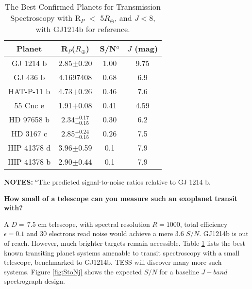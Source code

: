 \documentclass[12pt]{article}
\begin{document}
\begin{table}
 \centering
 \caption{The Best Confirmed Planets for Transmission Spectroscopy with R$_P$ $<$ 5$R_{\oplus}$, and $J<8$, with GJ1214b for reference.  }
 \label{tbl:StoN}
 \begin{tabular}{cccc}
    \hline
    \hline
    Planet & R$_P$($R_{\oplus}$) & S/N$^a$ &$J$ (mag) \\
    \hline
 GJ 1214 b  & 2.85$\pm$0.20 & 1.00 & 9.75\\
 GJ 436 b  & 4.1697408 & 0.68 & 6.9\\
 HAT-P-11 b  & 4.73$\pm$0.26 & 0.46 &7.6 \\
 55 Cnc e  & 1.91$\pm$0.08 & 0.41 & 4.59\\
 HD 97658 b  & 2.34$^{+0.17}_{-0.15}$ & 0.30 & 6.2\\
 HD 3167 c & 2.85$^{+0.24}_{-0.15}$ & 0.26 & 7.5\\
 HIP 41378 d  & 3.96$\pm$0.59 & 0.1 &7.9\\
 HIP 41378 b  & 2.90$\pm$0.44 & 0.1 &7.9\\
   \hline
    \hline
 \end{tabular}
\begin{flushleft}
 \footnotesize{ \textbf{\textsc{NOTES:}}
$^a$The predicted signal-to-noise ratios relative to GJ 1214 b.
}
\end{flushleft}
\end{table}

\textbf{How small of a telescope can you measure such an exoplanet transit with?}

A $D=\,7.5$ cm telescope, with spectral resolution $R=1000$, total efficiency $\epsilon=0.1$ and 30 electrons read noise would achieve a mere 3.6 $S/N$.  GJ1214b is out of reach.  However, much brighter targets remain accessible.  Table \ref{tbl:StoN} lists the best known transiting planet systems amenable to transit spectroscopy with a small telescope, benchmarked to GJ1214b.  TESS will discover many more such systems.  Figure \ref{fig:StoNj} shows the expected $S/N$ for a baseline $J-band$ spectrograph design.
\end{document}

